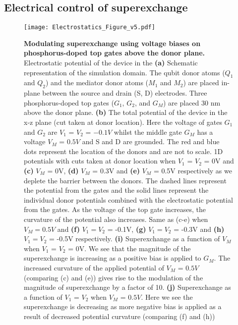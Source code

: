 \documentclass[%
showkeys,
 amsmath,amssymb,
 aps,
prb,
]{revtex4-2}
\begin{document}
\subsection{Electrical control of superexchange}
\begin{figure}[htb!]
    \centering
    \texttt{[image: Electrostatics\_Figure\_v5.pdf]}
    \caption{\textbf{Modulating superexchange using voltage biases on phosphorus-doped top gates above the donor plane.} Electrostatic potential of the device in the \textbf{(a)} Schematic representation of the simulation domain. The qubit donor atoms ($Q_1$ and $Q_2$) and the mediator donor atoms ($M_1$ and $M_2$) are placed in-plane between the source and drain (S, D) electrodes. Three phosphorus-doped top gates ($G_1$, $G_2$, and $G_M$) are placed 30 nm above the donor plane. \textbf{(b)} The total potential of the device in the x-z plane (cut taken at donor location). Here the voltage of gates $G_1$ and $G_2$ are $V_1$ = $V_2$ = $-0.1V$ whilst the middle gate $G_M$ has a voltage $V_M$ = $0.5V$ and S and D are grounded. The red and blue dots represent the location of the donors and are not to scale. 1D potentials with cuts taken at donor location when $V_1$ = $V_2$ = 0V and \textbf{(c)} $V_M$ = 0V, \textbf{(d)} $V_M$ = 0.3V and \textbf{(e)} $V_M$ = 0.5V respectively as we deplete the barrier between the donors. The dashed lines represent the potential from the gates and the solid lines represent the individual donor potentials combined with the electrostatic potential from the gates. As the voltage of the top gate increases, the curvature of the potential also increases. Same as (c-e) when $V_M = 0.5V$ and \textbf{(f)} $V_1 = V_2$ = -0.1V, \textbf{(g)} $V_1 = V_2$ = -0.3V and \textbf{(h)} $V_1 = V_2$ = -0.5V respectively. \textbf{(i)} Superexchange as a function of $V_M$ when $V_1$ = $V_2$ = 0V. We see that the magnitude of the superexchange is increasing as a positive bias is applied to $G_M$. The increased curvature of the applied potential of $V_M$ = $0.5V$ (comparing (c) and (e)) gives rise to the  modulation of the magnitude of superexchange by a factor of 10. \textbf{(j)} Superexchange as a function of $V_1$ = $V_2$ when $V_M$ = $0.5V$. Here we see the superexchange is decreasing as more negative bias is applied as a result of decreased potential curvature (comparing (f) and (h))} 
    \label{fig:electrostatics}
\end{figure}
\end{document}
